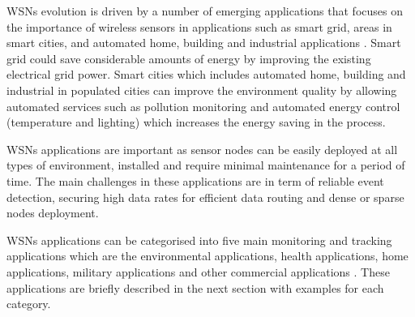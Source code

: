 
WSNs evolution is driven by a number of emerging applications that focuses on the importance of wireless sensors in applications such as smart grid, areas in smart cities, and automated home, building and industrial applications \cite{beyondInteroperability}. Smart grid could save considerable amounts of energy by improving the existing electrical grid power. Smart cities which includes automated home, building and industrial in populated cities can improve the environment quality by allowing automated services such as pollution monitoring and automated energy control (temperature and lighting) which increases the energy saving in the process. 

WSNs applications are important as sensor nodes can be easily deployed at all types of environment, installed and require minimal maintenance for a period of time. The main challenges in these applications are in term of reliable event detection, securing high data rates for efficient data routing and dense or sparse nodes deployment.

WSNs applications can be categorised into five main monitoring and tracking applications which are the environmental applications, health applications, home applications, military applications and other commercial applications \cite{wsnSurvey2}. These applications are briefly described in the next section with examples for each category. 




